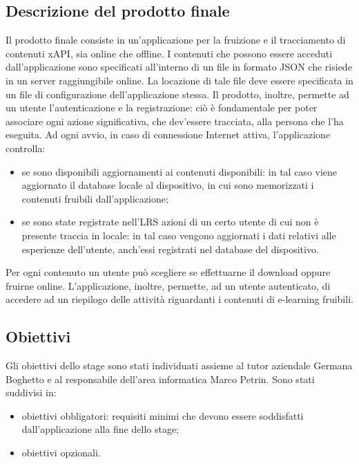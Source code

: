 \documentclass[../Tesi.tex]{subfiles}
\begin{document}
	\subsection{Descrizione del prodotto finale}
	Il prodotto finale consiste in un'applicazione per la fruizione e il tracciamento di contenuti xAPI, sia online che offline. I contenuti che possono essere acceduti dall’applicazione sono specificati all'interno di un file in formato JSON che risiede in un server raggiungibile online. La locazione di tale file deve essere specificata in un file di configurazione dell'applicazione stessa. Il prodotto, inoltre, permette ad un utente l'autenticazione e la registrazione: ciò è fondamentale per poter associare ogni azione significativa, che dev'essere tracciata, alla persona che l'ha eseguita. Ad ogni avvio, in caso di connessione Internet attiva, l'applicazione controlla:
	\begin{itemize}
		\item se sono disponibili aggiornamenti ai contenuti disponibili: in tal caso viene aggiornato il database locale al dispositivo, in cui sono memorizzati i contenuti fruibili dall'applicazione;
		\item se sono state registrate nell'LRS azioni di un certo utente di cui non è presente traccia in locale: in tal caso vengono aggiornati i dati relativi alle esperienze dell'utente, anch'essi registrati nel database del dispositivo.
	\end{itemize} 
	Per ogni contenuto un utente può scegliere se effettuarne il download oppure fruirne online.
	L'applicazione, inoltre, permette, ad un utente autenticato, di accedere ad un riepilogo delle attività riguardanti i contenuti di e-learning fruibili. 

	\subsection{Obiettivi}\label{subsec:obiettivi}
		Gli obiettivi dello stage sono stati individuati assieme al tutor aziendale Germana Boghetto e al responsabile dell'area informatica Marco Petrin. Sono stati suddivisi in:
		\begin{itemize}
			\item obiettivi obbligatori: requisiti minimi che devono essere soddisfatti dall'applicazione alla fine dello stage;
			\item obiettivi opzionali.
		\end{itemize}
\end{document}
